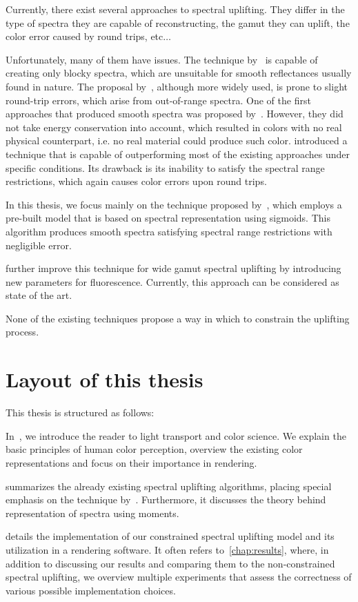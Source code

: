 Currently, there exist several approaches to spectral uplifting. They differ in the type of spectra they are capable of reconstructing, the gamut they can uplift, the color error caused by round trips, etc$\ldots$

Unfortunately, many of them have issues. The technique by~\citet{upsamplingMacAdam} is capable of creating only blocky spectra, which are unsuitable for smooth reflectances usually found in nature. The proposal by~\citet{upsamplingSmits}, although more widely used, is prone to slight round-trip errors, which arise from out-of-range spectra. One of the first approaches that produced smooth spectra was proposed by~\citet{upsamplingMeng}. However, they did not take energy conservation into account, which resulted in colors with no real physical counterpart, i.e. no real material could produce such color. \citet{upsamplingOtsu} introduced a technique that is capable of outperforming most of the existing approaches under specific conditions. Its drawback is its inability to satisfy the spectral range restrictions, which again causes color errors upon round trips.

In this thesis, we focus mainly on the technique proposed by~\citet{upsamplingJakobHanika}, which employs a pre-built model that is based on spectral representation using sigmoids. This algorithm produces smooth spectra satisfying spectral range restrictions with negligible error.

\citet{upsamplingFluorescence} further improve this technique for wide gamut spectral uplifting by introducing new parameters for fluorescence. Currently, this approach can be considered as state of the art.

None of the existing techniques propose a way in which to constrain the uplifting process.

\section*{Layout of this thesis}

This thesis is structured as follows:

In~, we introduce the reader to light transport and color science. We explain the basic principles of human color perception, overview the existing color representations and focus on their importance in rendering.

 summarizes the already existing spectral uplifting algorithms, placing special emphasis on the technique by~\citet{upsamplingJakobHanika}. Furthermore, it discusses the theory behind representation of spectra using moments.

 details the implementation of our constrained spectral uplifting model and its utilization in a rendering software. It often refers to~\cref{chap:results}, where, in addition to discussing our results and comparing them to the non-constrained spectral uplifting, we overview multiple experiments that assess the correctness of various possible implementation choices.